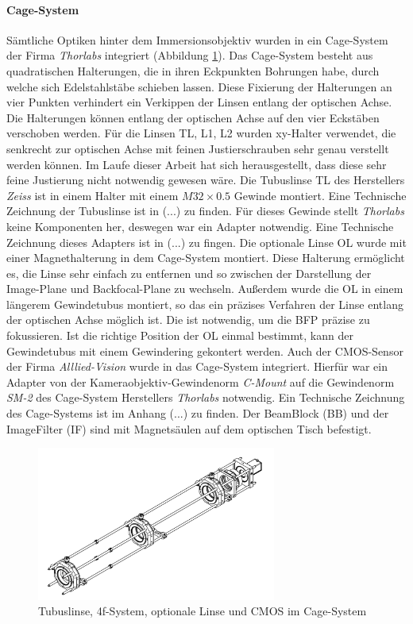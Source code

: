 \documentclass[titlepage]{article}
\begin{document}
		\paragraph{Cage-System}
			Sämtliche Optiken hinter dem Immersionsobjektiv wurden in ein Cage-System der Firma \textit{Thorlabs} integriert (Abbildung \ref{fig:cage_system}). Das Cage-System besteht aus quadratischen Halterungen, die in ihren Eckpunkten Bohrungen habe, durch welche sich Edelstahlstäbe schieben lassen. Diese Fixierung der Halterungen an vier Punkten verhindert ein Verkippen der Linsen entlang der optischen Achse. Die Halterungen können entlang der optischen Achse auf den vier Eckstäben verschoben werden. Für die  Linsen TL, L1, L2 wurden xy-Halter verwendet, die senkrecht zur optischen Achse mit feinen Justierschrauben sehr genau verstellt werden können. Im Laufe dieser Arbeit hat sich herausgestellt, dass diese sehr feine Justierung nicht notwendig gewesen wäre. Die Tubuslinse TL des Herstellers \textit{Zeiss} ist in einem Halter mit einem $M32\times0.5$ Gewinde montiert. Eine Technische Zeichnung der Tubuslinse ist in (...) zu finden. Für dieses Gewinde stellt \textit{Thorlabs} keine Komponenten her, deswegen war ein Adapter notwendig. Eine Technische Zeichnung dieses Adapters ist in (...) zu fingen. Die optionale Linse OL wurde mit einer Magnethalterung in dem Cage-System montiert. Diese Halterung ermöglicht es, die Linse sehr einfach zu entfernen und so zwischen der Darstellung der Image-Plane und Backfocal-Plane zu wechseln. Außerdem wurde die OL in einem längerem Gewindetubus montiert, so das ein präzises Verfahren der Linse entlang der optischen Achse möglich ist. Die ist notwendig, um die BFP präzise zu fokussieren. Ist die richtige Position der OL einmal bestimmt, kann der Gewindetubus mit einem Gewindering gekontert werden. Auch der CMOS-Sensor der Firma \textit{Alllied-Vision} wurde in das Cage-System integriert. Hierfür war ein Adapter von der Kameraobjektiv-Gewindenorm \textit{C-Mount} auf die Gewindenorm \textit{SM-2} des Cage-System Herstellers \textit{Thorlabs} notwendig. Ein Technische Zeichnung des Cage-Systems ist im Anhang (...) zu finden. Der BeamBlock (BB) und der ImageFilter (IF) sind mit Magnetsäulen auf dem optischen Tisch befestigt.
			\begin{figure}[htbp] 
				\centering
				\includegraphics[width=0.7\textwidth]{figures/Cage_System.pdf}
				\caption{Tubuslinse, 4f-System, optionale Linse und CMOS im Cage-System}
				\label{fig:cage_system}
			\end{figure}	
\end{document}
